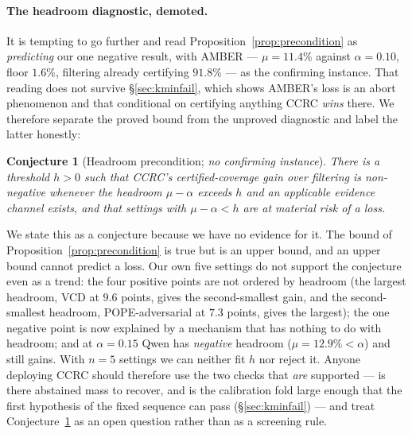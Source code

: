 \documentclass{article}
\theoremstyle{plain}
\newtheorem{conjecture}{Conjecture}
\theoremstyle{definition}
\theoremstyle{remark}
\begin{document}
\paragraph{The headroom diagnostic, demoted.}
It is tempting to go further and read Proposition~\ref{prop:precondition} as \emph{predicting}
our one negative result, with AMBER --- $\mu=11.4\%$ against $\alpha=0.10$, floor $1.6\%$,
filtering already certifying $91.8\%$ --- as the confirming instance. That reading
does not survive \S\ref{sec:kminfail}, which shows AMBER's loss is an abort phenomenon and that
conditional on certifying anything CCRC \emph{wins} there. We therefore separate the proved
bound from the unproved diagnostic and label the latter honestly:

\begin{conjecture}[Headroom precondition; \emph{no confirming instance}]
\label{conj:headroom}
There is a threshold $h>0$ such that CCRC's certified-coverage gain over filtering is
non-negative whenever the headroom $\mu-\alpha$ exceeds $h$ and an applicable evidence channel
exists, and that settings with $\mu-\alpha<h$ are at material risk of a loss.
\end{conjecture}

We state this as a conjecture because we have no evidence for it. The bound of
Proposition~\ref{prop:precondition} is true but is an upper bound, and an upper bound cannot
predict a loss. Our own five settings do not support the conjecture even as a trend: the four
positive points are not ordered by headroom (the largest headroom, VCD at $9.6$ points, gives
the second-smallest gain, and the second-smallest headroom, POPE-adversarial at $7.3$ points,
gives the largest); the one negative point is now explained by a mechanism that has nothing to do
with headroom; and at $\alpha=0.15$ Qwen has \emph{negative} headroom ($\mu=12.9\%<\alpha$) and
still gains. With $n=5$ settings we can neither fit $h$ nor reject it. Anyone deploying CCRC
should therefore use the two checks that \emph{are} supported --- is there abstained mass to
recover, and is the calibration fold large enough that the first hypothesis of the fixed
sequence can pass (\S\ref{sec:kminfail}) --- and treat Conjecture~\ref{conj:headroom} as an open
question rather than as a screening rule.
\end{document}
